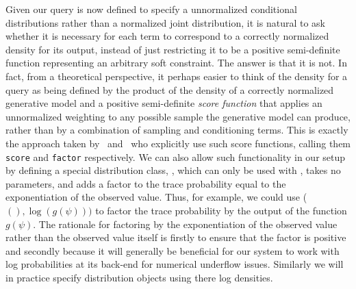 Given our query is now defined to specify a unnormalized conditional distributions rather than a normalized
joint distribution, it is natural to ask whether it is necessary for each \observe term to correspond to
a correctly normalized density for its output, instead of just restricting it to be a positive semi-definite
function representing an arbitrary soft constraint.  The answer is that it is not.  In fact, from a theoretical perspective,
it perhaps easier
to think of the density for a query as being defined by the product of the density of a correctly normalized generative
model and a positive semi-definite \emph{score function} that applies an unnormalized weighting to any possible
sample the generative model can produce, rather than by a combination of sampling and conditioning terms.  This is
exactly the approach taken by~\citep{staton2016semantics} and~\citep{goodman_book_2014} who explicitly use such
score functions, calling them {\small \texttt{score}} and {\small \texttt{factor}} respectively.
We can also allow such functionality in our setup by defining a
special distribution class, \boppfactor, which can only be used with \observe, takes no parameters, and 
adds a factor to the trace probability equal to the exponentiation of the observed value.  Thus, for example, we could use
\observe (\boppfactor$(),\log(g(\psi)))$ to factor the trace probability by the output of the function $g(\psi)$.
The rationale for factoring by the exponentiation of the observed value rather than the observed value itself
is firstly to ensure that the factor is positive and secondly because it will generally be beneficial for
our system to work with log probabilities at its back-end for numerical underflow issues.  Similarly
we will in practice specify distribution objects using there log densities.

